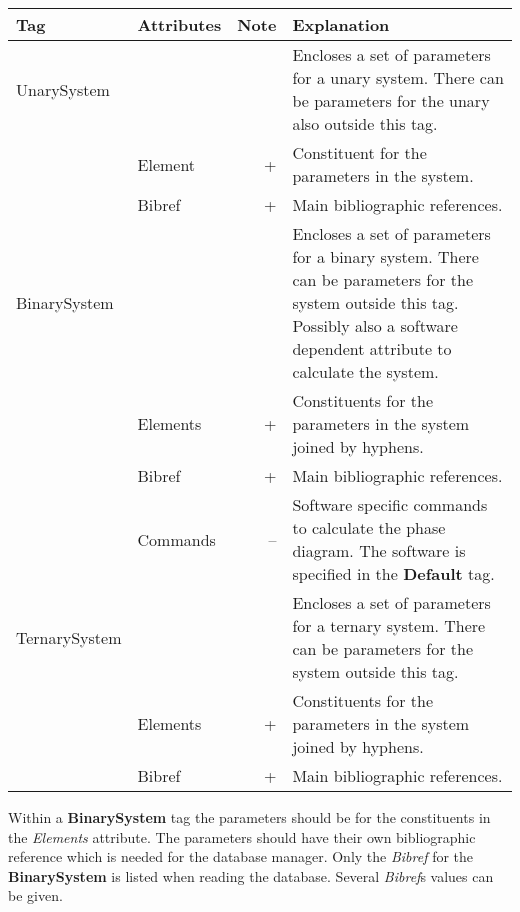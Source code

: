 \documentclass{article}
\begin{document}
\bigskip
\begin{tabular}{|p{} p{} r p{}|}\hline
  Tag & Attributes & Note & Explanation\\\hline

  UnarySystem  &&& Encloses a set of parameters for a unary system.
          There can be parameters for the unary also outside this tag.\\
          & Element  &+& Constituent for the parameters in the system.\\
          & Bibref &+& Main bibliographic references.\\\hline

  BinarySystem  &&& Encloses a set of parameters for a binary system.
          There can be parameters for the system outside this tag.  Possibly
          also a software dependent attribute to calculate the system.\\
          & Elements &+& Constituents for the parameters in the system joined
                       by hyphens.\\
          & Bibref &+& Main bibliographic references.\\
          & Commands & -- & Software specific commands to calculate the
                       phase diagram.  The software is specified in the
                       {\bf Default} tag.\\\hline

  TernarySystem  &&& Encloses a set of parameters for a ternary system.
          There can be parameters for the system outside this tag.\\
          & Elements &+& Constituents for the parameters in the system joined
                       by hyphens.\\
          & Bibref &+& Main bibliographic references.\\\hline
\end{tabular}

\bigskip
Within a {\bf BinarySystem} tag the parameters should be for the
constituents in the {\em Elements} attribute.  The parameters should
have their own bibliographic reference which is needed for the
database manager.  Only the {\em Bibref} for the {\bf BinarySystem} is
listed when reading the database.  Several {\em Bibref}s values can be
given.
\end{document}
